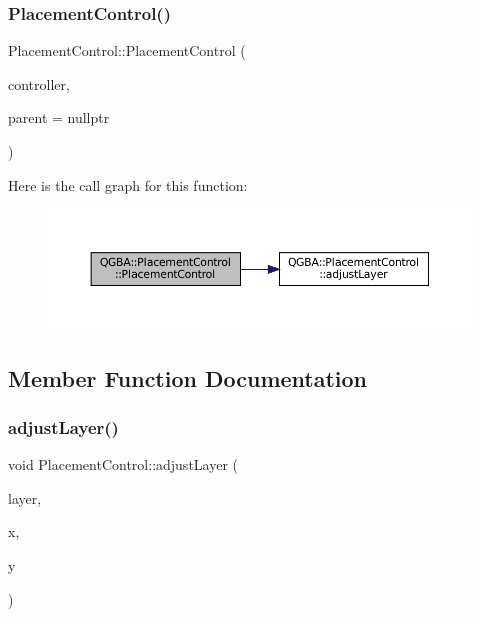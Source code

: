 \subsubsection{\texorpdfstring{Placement\+Control()}{PlacementControl()}}
{\footnotesize\ttfamily Placement\+Control\+::\+Placement\+Control (\begin{DoxyParamCaption}\item[{std\+::shared\+\_\+ptr$<$ \mbox{\hyperlink{class_q_g_b_a_1_1_core_controller}{Core\+Controller}} $>$}]{controller,  }\item[{Q\+Widget $\ast$}]{parent = {\ttfamily nullptr} }\end{DoxyParamCaption})}

Here is the call graph for this function\+:
\nopagebreak
\begin{figure}[H]
\begin{center}
\leavevmode
\includegraphics[width=350pt]{class_q_g_b_a_1_1_placement_control_a0636f6ceeeff0619130e8720e1cbd80b_cgraph}
\end{center}
\end{figure}


\subsection{Member Function Documentation}
\mbox{\label{class_q_g_b_a_1_1_placement_control_a3ad4059487a2fa2c77a7c9705379f671}} 
\subsubsection{\texorpdfstring{adjust\+Layer()}{adjustLayer()}}
{\footnotesize\ttfamily void Placement\+Control\+::adjust\+Layer (\begin{DoxyParamCaption}\item[{\mbox{\hyperlink{ioapi_8h_a787fa3cf048117ba7123753c1e74fcd6}{int}}}]{layer,  }\item[{int32\+\_\+t}]{x,  }\item[{int32\+\_\+t}]{y }\end{DoxyParamCaption})\hspace{0.3cm}{\ttfamily [private]}}

